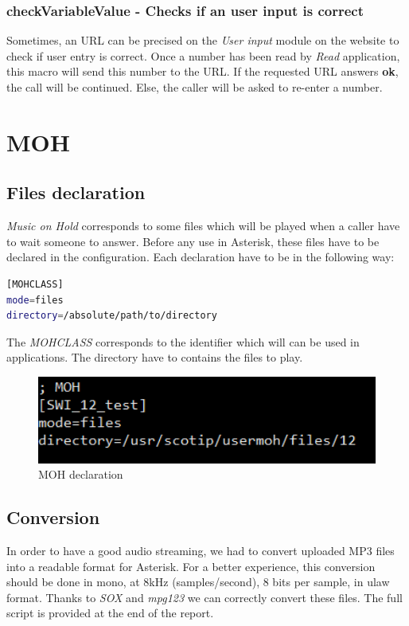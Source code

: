 \subsubsection{checkVariableValue - Checks if an user input is correct}
Sometimes, an URL can be precised on the \textit{User input} module on the website to check if user entry is correct. Once a number has been read by \textit{Read} application, this macro will send this number to the URL. If the requested URL answers \textbf{ok}, the call will be continued. Else, the caller will be asked to re-enter a number.




\section{MOH}
\subsection{Files declaration}
\textit{Music on Hold} corresponds to some files which will be played when a caller have to wait someone to answer. Before any use in Asterisk, these files have to be declared in the configuration. 
Each declaration have to be in the following way: 

\begin{lstlisting}[language=bash,caption={bash}]
[MOHCLASS]
mode=files
directory=/absolute/path/to/directory
\end{lstlisting}

The \textit{MOHCLASS} corresponds to the identifier which will can be used in applications. The directory have to contains the files to play. 


\begin{figure}[H]
  \caption{MOH declaration}
  \centering
    \includegraphics[width=1\textwidth]{img/MOH.png}
\end{figure}


\subsection{Conversion}
In order to have a good audio streaming, we had to convert uploaded MP3 files into a readable format for Asterisk. For a better experience, this conversion should be done in mono, at 8kHz (samples/second), 8 bits per sample, in ulaw format. Thanks to \textit{SOX} and \textit{mpg123} we can correctly convert these files.	
The full script is provided at the end of the report.





